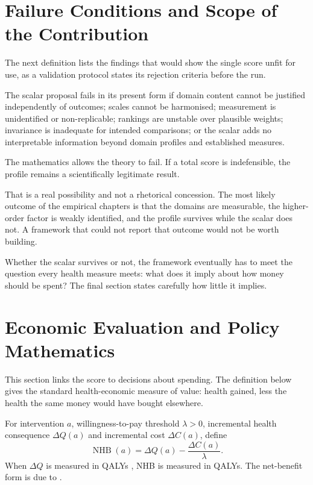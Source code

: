 \section{Failure Conditions and Scope of the Contribution}
\label{app:a-failure}

The next definition lists the findings that would show the single score unfit
for use, as a validation protocol states its rejection criteria before the run.

\begin{definition}
The scalar proposal fails in its present form if domain content cannot be
justified independently of outcomes; scales cannot be harmonised; measurement
is unidentified or non-replicable; rankings are unstable over plausible
weights; invariance is inadequate for intended comparisons; or the scalar adds
no interpretable information beyond domain profiles and established measures.
\end{definition}

\begin{remark}
The mathematics allows the theory to fail. If a total score is indefensible,
the profile remains a scientifically legitimate result.
\end{remark}

That is a real possibility and not a rhetorical concession. The most likely
outcome of the empirical chapters is that the domains are measurable, the
higher-order factor is weakly identified, and the profile survives while the
scalar does not. A framework that could not report that outcome would not be
worth building.

Whether the scalar survives or not, the framework eventually has to meet the
question every health measure meets: what does it imply about how money should
be spent? The final section states carefully how little it implies.

\section{Economic Evaluation and Policy Mathematics}
\label{app:a-economics}

This section links the score to decisions about spending. The definition below
gives the standard health-economic measure of value: health gained, less the
health the same money would have bought elsewhere.

\begin{definition}
For intervention $a$, willingness-to-pay threshold $\lambda>0$, incremental
health consequence $\Delta Q(a)$ and incremental cost $\Delta C(a)$, define
\[
\operatorname{NHB}(a)=\Delta Q(a)-\frac{\Delta C(a)}{\lambda}.
\]
When $\Delta Q$ is measured in QALYs \citep{whitehead_2010}, NHB is measured in QALYs. The net-benefit form is due to \citet{stinnett_mullahy_1998}.
\end{definition}

